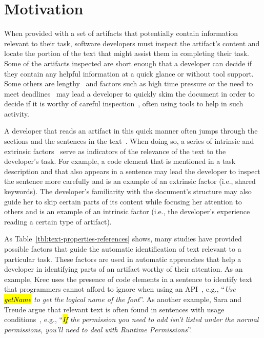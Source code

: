 \section{Motivation}
\label{cp5:motivation}


When provided with a set of artifacts that potentially contain information relevant to their task,
software developers must inspect the artifact's content and locate the portion of the text that might assist them in completing their task. 
Some of the artifacts inspected are short enough that a developer can decide if they contain any helpful information at a quick glance or without tool support.
Some others are lengthy~\cite{Rastkar2013t} and factors such as high time pressure or the need to meet deadlines~\cite{meyer2019}
may lead a developer to quickly skim the document
in order to decide if it is worthy of careful inspection~\cite{Starke2009},
often using tools to help in such activity.



A developer that 
reads an artifact in this quick manner
often jumps through the sections and the sentences in the text~\cite{Brandt2009a, Starke2009}.
When doing so, a series of intrinsic and extrinsic factors~\cite{Freund2015} 
serve as indicators of the relevance of the text to the developer's task.
For example, a code element that is mentioned in a task description 
and that also appears in a sentence may lead 
the developer to inspect the sentence more carefully and is an example of an extrinsic factor (i.e., shared keywords).
The developer's familiarity with the document's structure
may also guide her to skip certain parts of its content while focusing her attention to others and is 
an example of an intrinsic factor (i.e., the developer's experience reading a certain type of artifact).





As Table~\ref{tbl:text-properties-references} shows, many studies have 
provided possible factors that guide the automatic identification of text relevant to a particular task.
These factors are used in automatic approaches that help a developer in identifying parts of an artifact worthy of their attention.
As an example, Krec uses the presence of code elements in a sentence to identify 
text that programmers cannot afford to ignore when using an API~\cite{Robillard2015}, 
e.g., ``\textit{Use \hl{getName} to get the logical name of the font}''.
As another example, Sara and Treude argue that relevant text is often found in sentences
with usage conditions~\cite{nadi2020}, 
e.g., ``\textit{\hl{If} the permission you need to add isn't listed under the normal permissions, you'll need to deal with Runtime Permissions}''.


